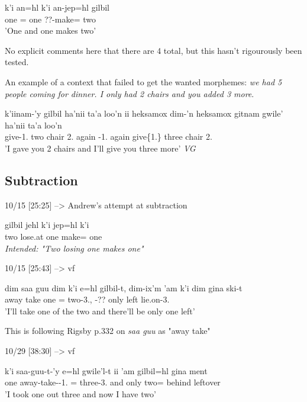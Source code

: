 \documentclass{article}
\begin{document}
\begin{exe}
\ex \gll k'i an=hl k'i an-jep=hl gilbil\\
one \Pcnj{}=\Cn{} one ??-make=\Cn{} two\\
'One and one makes two'
\end{exe}
No explicit comments here that there are 4 total, but this hasn't rigourously been tested.

An example of a context that failed to get the wanted morphemes:
\textit{we had 5 people coming for dinner. I only had 2 chairs and you added 3 more}.
\begin{exe}
\ex \gll k'iinam-'y gilbil ha'nii ta'a loo'n  ii heksamox dim-'n heksamox gitnam gwile' ha'nii ta'a loo'n\\
give-1.\Ii{} two chair {} 2.\Prep{} \Ccnj{} again \Fut{}-1.\I{} again give\{1.\Ii{}\} three chair {} 2.\Prep{}\\
'I gave you 2 chairs and I'll give you three more' \textit{VG}
\end{exe}

\subsection{Subtraction}

10/15 [25:25] --> Andrew's attempt at subtraction
\begin{exe}
\ex \gll gilbil jehl k'i jep=hl k'i\\
two lose.at one make=\Cn{} one\\
\textit{Intended: "Two losing one makes one"}
\end{exe}

10/15 [25:43] --> vf
\begin{exe}
\ex \gll dim saa guu dim k'i e=hl gilbil-t, dim-ix'm 'am k'i dim gina ski-t\\
\Fut{} away take \Fut{} one \Prep{}=\Cn{} two-3.\Ii{}, \Fut{}-?? only \Fut{} left lie.on-3.\Ii{}\\
'I'll take one of the two and there'll be only one left'
\end{exe}
This is following Rigsby p.332 on \textit{saa guu} as "away take"

10/29 [38:30] --> vf
\begin{exe}
\ex \gll k'i saa-guu-t-'y e=hl gwile'l-t ii 'am gilbil=hl gina ment\\
one away-take-\Trn{}-1.\Ii{} \Prep{}=\Cn{} three-3.\Ii{} and only two=\Cn{} behind leftover\\
'I took one out three and now I have two'
\end{exe}
\end{document}
